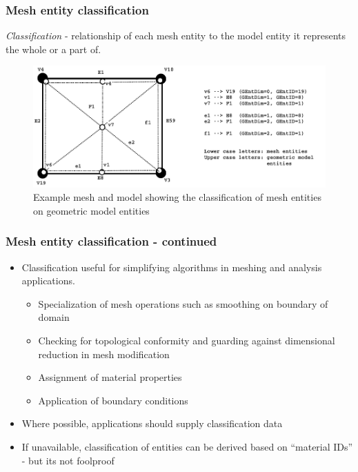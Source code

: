 \documentclass{beamer}
\begin{document}
\begin{frame}
\frametitle{Mesh entity classification}

{\em Classification} - relationship of each mesh entity to the model
entity it represents the whole or a part of.

\begin{figure}
  \begin{center}
    \includegraphics[width=\textwidth]{figures/classfn}
  \end{center}
  \caption{Example mesh and model showing the classification of mesh entities on geometric model entities}
\end{figure}

\end{frame}

\begin{frame}
\frametitle{Mesh entity classification - continued}

\begin{itemize}
\item Classification useful for simplifying algorithms in meshing and
  analysis applications.
  \begin{itemize}
  \item Specialization of mesh operations such as smoothing on
    boundary of domain
  \item Checking for topological conformity and guarding against
    dimensional reduction in mesh modification
  \item Assignment of material properties
  \item Application of boundary conditions
  \end{itemize}
\item Where possible, applications should supply classification data
\item If unavailable, classification of entities can be derived based
  on ``material IDs'' - but its not foolproof
\end{itemize}

\end{frame}
\end{document}
